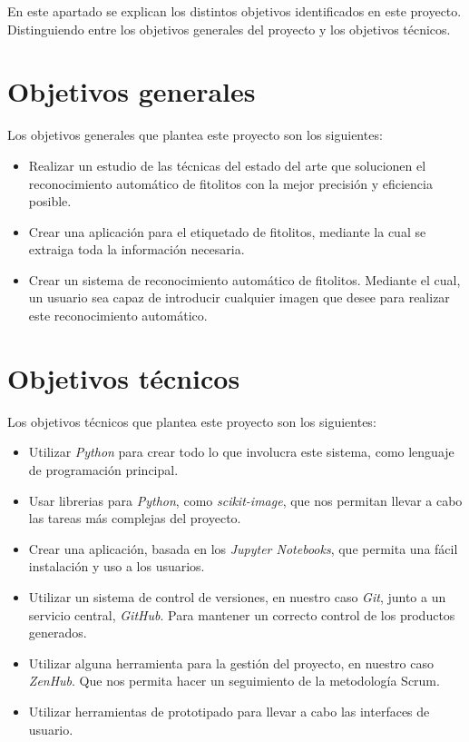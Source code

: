 

En este apartado se explican los distintos objetivos identificados en este proyecto. Distinguiendo entre los objetivos generales del proyecto y los objetivos técnicos.

\section{Objetivos generales}

Los objetivos generales que plantea este proyecto son los siguientes:

\begin{itemize}
	\item Realizar un estudio de las técnicas del estado del arte que solucionen el reconocimiento automático de fitolitos con la mejor precisión y eficiencia posible.
	\item Crear una aplicación para el etiquetado de fitolitos, mediante la cual se extraiga toda la información necesaria.
	\item Crear un sistema de reconocimiento automático de fitolitos. Mediante el cual, un usuario sea capaz de introducir cualquier imagen que desee para realizar este reconocimiento automático.
\end{itemize}

\section{Objetivos técnicos}

Los objetivos técnicos que plantea este proyecto son los siguientes:

\begin{itemize}
	\item Utilizar \textit{Python} para crear todo lo que involucra este sistema, como lenguaje de programación principal.
	\item Usar librerias para \textit{Python}, como \textit{scikit-image}\cite{scikit-image}, que nos permitan llevar a cabo las tareas más complejas del proyecto.
	\item Crear una aplicación, basada en los \textit{Jupyter Notebooks}, que permita una fácil instalación y uso a los usuarios.
	\item Utilizar un sistema de control de versiones, en nuestro caso \textit{Git}, junto a un servicio central, \textit{GitHub}. Para mantener un correcto control de los productos generados.
	\item Utilizar alguna herramienta para la gestión del proyecto, en nuestro caso \textit{ZenHub}. Que nos permita hacer un seguimiento de la metodología Scrum.
	\item Utilizar herramientas de prototipado para llevar a cabo las interfaces de usuario.
\end{itemize}
